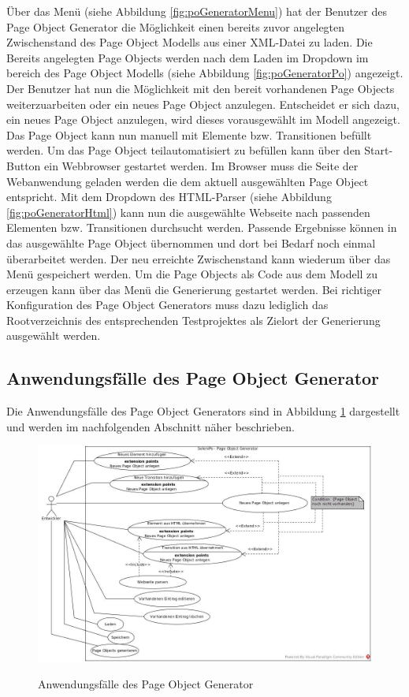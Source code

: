 Über das Menü (siehe Abbildung \ref{fig:poGeneratorMenu}) hat der Benutzer des Page Object Generator die Möglichkeit einen bereits zuvor angelegten Zwischenstand des Page Object Modells aus einer XML-Datei zu laden. Die Bereits angelegten Page Objects werden nach dem Laden im Dropdown im bereich des Page Object Modells (siehe Abbildung \ref{fig:poGeneratorPo}) angezeigt. Der Benutzer hat nun die Möglichkeit mit den bereit vorhandenen Page Objects weiterzuarbeiten oder ein neues Page Object anzulegen. Entscheidet er sich dazu, ein neues Page Object anzulegen, wird dieses vorausgewählt im Modell angezeigt. Das Page Object kann nun manuell mit Elemente bzw. Transitionen befüllt werden. Um das Page Object teilautomatisiert zu befüllen kann über den Start-Button ein Webbrowser gestartet werden. Im Browser muss die Seite der Webanwendung geladen werden die dem aktuell ausgewählten Page Object entspricht. Mit dem Dropdown des HTML-Parser (siehe Abbildung \ref{fig:poGeneratorHtml}) kann nun die ausgewählte Webseite nach passenden Elementen bzw. Transitionen durchsucht werden.
Passende Ergebnisse können in das ausgewählte Page Object übernommen und dort bei Bedarf noch einmal überarbeitet werden.
Der neu erreichte Zwischenstand kann wiederum über das Menü gespeichert werden.
Um die Page Objects als Code aus dem Modell zu erzeugen kann über das Menü die Generierung gestartet werden. Bei richtiger Konfiguration des Page Object Generators muss dazu lediglich das Rootverzeichnis des entsprechenden Testprojektes als Zielort der Generierung ausgewählt werden.


\subsection{Anwendungsfälle des Page Object Generator}
\label{sec:page_object_generator_usecases}

Die Anwendungsfälle des Page Object Generators sind in Abbildung \ref{fig:use_case} dargestellt und werden im nachfolgenden Abschnitt näher beschrieben. 

\begin{figure}[htb]
  \centering  
  \includegraphics[scale=0.45]{img/Use-Cases.jpg}\\
  \caption{Anwendungsfälle des Page Object Generator}
  \label{fig:use_case}
\end{figure}

